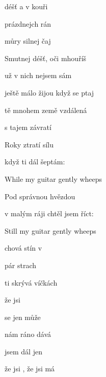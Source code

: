 

\zs
{} déšť a  v kouři

 prázdnejch rán 

 můry  silnej čaj 
\ks

\zs
Smutnej déšť, oči mhouříš

už v nich nejsem sám

ještě málo žijou když se ptaj
\ks

\zr
{} tě mnohem  země vzdálená  

 s tajem závratí 
\kr

\zs
Roky ztratí sílu

když ti dál šeptám:

While my guitar gently wheeps
\ks

\zs
Pod správnou hvězdou

v malým ráji chtěl jsem říct:

Still my guitar gently wheeps
\ks

\zs
{} chová stín v 

 pár  strach

 ti skrývá  víčkách

že jsi 
\ks

\zs
{} se jen může 

 nám ráno dává 

 jsem dál jen 

že jsi , že jsi má 
\ks

\zr
\kr

\kp






















